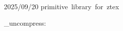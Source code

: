   {2025/09/20}{\ztex@versi@n}
  {primitive~library~for~ztex}


\NewDocumentCommand{\uncompressPDF}{}
  {
    \pdf_uncompress:

  }
\@onlypreamble\uncompressPDF